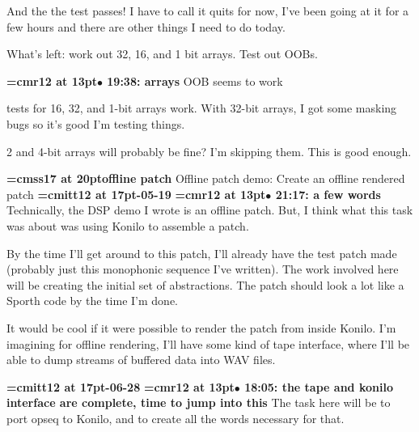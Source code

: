 And the the test passes! I have to call it quits for now, I've been going at it for a few hours and there are other things I need to do today.
\par

What's left: work out 32, 16, and 1 bit arrays. Test out OOBs.
\par

{\smallskip\noindent\bf\font\titlefont=cmr12 at 13pt\titlefont $\bullet$ 19:38: arrays}\smallskip
OOB seems to work
\par

tests for 16, 32, and 1-bit arrays work. With 32-bit arrays, I got some masking bugs so it's good I'm testing things.
\par

2 and 4-bit arrays will probably be fine? I'm skipping them. This is good enough.
\par

{\medskip\noindent\bf\font\titlefont=cmss17 at 20pt\titlefont offline patch}\medskip
Offline patch demo: Create an offline rendered patch
{\medskip\noindent\bf\font\titlefont=cmitt12 at 17pt-05-19}\medskip
{\smallskip\noindent\bf\font\titlefont=cmr12 at 13pt\titlefont $\bullet$ 21:17: a few words}\smallskip
Technically, the DSP demo I wrote is an offline patch. But, I think what this task was about was using Konilo to assemble a patch.
\par

By the time I'll get around to this patch, I'll already have the test patch made (probably just this monophonic sequence I've written). The work involved here will be creating the initial set of abstractions. The patch should look a lot like a Sporth code by the time I'm done.
\par

It would be cool if it were possible to render the patch from inside Konilo. I'm imagining for offline rendering, I'll have some kind of tape interface, where I'll be able to dump streams of buffered data into WAV files.
\par

{\medskip\noindent\bf\font\titlefont=cmitt12 at 17pt-06-28}\medskip
{\smallskip\noindent\bf\font\titlefont=cmr12 at 13pt\titlefont $\bullet$ 18:05: the tape and konilo interface are complete, time to jump into this}\smallskip
The task here will be to port opseq to Konilo, and to create all the words necessary for that.
\par


